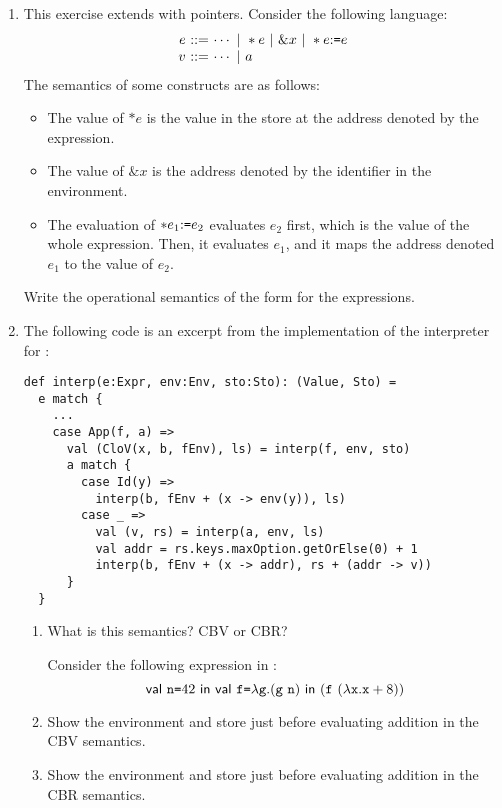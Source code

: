 \begin{enumerate}
\item
This exercise extends \lang with pointers.
Consider the following language:
\[
  \begin{array}{@{}r@{~}r@{~}l@{}}
    e & ::= & \cdots\ |\ \ast e \ |\ \& x\ |\ \ast\eset{e}{e} \\
    v & ::= & \cdots\ |\ a \\
  \end{array}
\]
The semantics of some constructs are as follows:
\begin{itemize}
  \item The value of $\ast e$ is the value in the store at the address denoted by
    the expression.
  \item The value of $\& x$ is the address denoted by the identifier in the environment.
  \item The evaluation of $\ast e_1{:}\texttt{=} e_2$ evaluates $e_2$ first, which is
    the value of the whole expression. Then, it evaluates $e_1$, and it maps the
    address denoted $e_1$ to the value of $e_2$.
\end{itemize}
Write the operational semantics of the form  for the expressions.

\item The following code is an excerpt from the implementation of the interpreter for
\lang:
\begin{verbatim}
def interp(e:Expr, env:Env, sto:Sto): (Value, Sto) =
  e match {
    ...
    case App(f, a) =>
      val (CloV(x, b, fEnv), ls) = interp(f, env, sto)
      a match {
        case Id(y) =>
          interp(b, fEnv + (x -> env(y)), ls)
        case _ =>
          val (v, rs) = interp(a, env, ls)
          val addr = rs.keys.maxOption.getOrElse(0) + 1
          interp(b, fEnv + (x -> addr), rs + (addr -> v))
      }
  }
\end{verbatim}

\begin{enumerate}
  \item What is this semantics? CBV or CBR?

    \vspace{1em}
    \hspace{-2.5em}
Consider the following expression in \lang:
\[
\ebind{\code{n}}{42}{
    \ebind{\code{f}}{\efun{\code{g}}{(\eapp{\code{g}}{\code{n}})}}{
        (\eapp{\code{f}}{(\efun{\cx}{\eadd{\cx}{8}})})
    }
}
\]
\item Show the environment and store just before evaluating addition in the CBV semantics.
\item Show the environment and store just before evaluating addition in the CBR semantics.
\end{enumerate}


\end{enumerate}
